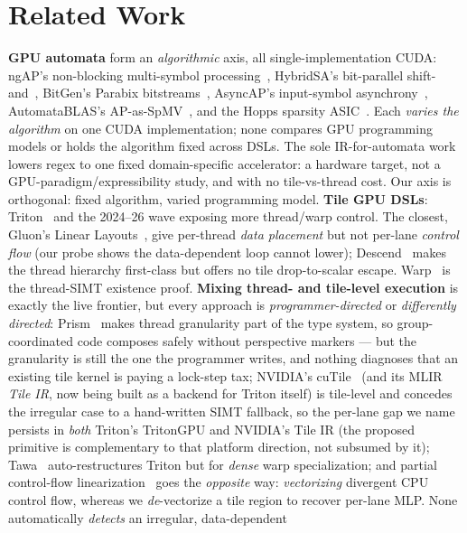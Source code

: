 \documentclass[sigplan,review,anonymous,10pt]{acmart}
\begin{document}
\section{Related Work}
\textbf{GPU automata} form an \emph{algorithmic} axis, all single-implementation CUDA: ngAP's
non-blocking multi-symbol processing~\cite{ngap2024}, HybridSA's bit-parallel
shift-and~\cite{hybridsa2024}, BitGen's Parabix bitstreams~\cite{bitgen2025}, AsyncAP's
input-symbol asynchrony~\cite{asyncap2023}, AutomataBLAS's AP-as-SpMV~\cite{automatablas2025}, and
the Hopps sparsity ASIC~\cite{hopps2025}. Each \emph{varies the algorithm} on one CUDA
implementation; none compares GPU programming models or holds the algorithm fixed across DSLs. The
sole IR-for-automata work~\cite{mlirregex2025} lowers regex to one fixed domain-specific accelerator:
a hardware target, not a GPU-paradigm/expressibility study, and with no tile-vs-thread cost. Our
axis is orthogonal: fixed algorithm, varied programming model.
\textbf{Tile GPU DSLs}: Triton~\cite{triton2019} and the 2024--26 wave exposing more thread/warp
control. The closest, Gluon's Linear Layouts~\cite{linearlayouts2025}, give per-thread \emph{data
placement} but not per-lane \emph{control flow} (our probe shows the data-dependent loop cannot
lower); Descend~\cite{descend2024} makes the thread hierarchy first-class but offers no tile
drop-to-scalar escape. Warp~\cite{warp2022} is the thread-SIMT existence proof.
\textbf{Mixing thread- and tile-level execution} is exactly the live frontier, but every approach is
\emph{programmer-directed} or \emph{differently directed}: Prism~\cite{prism2026} makes thread
granularity part of the type system, so group-coordinated code composes safely without perspective
markers --- but the granularity is still the one the programmer writes, and nothing diagnoses that an
existing tile kernel is paying a lock-step tax; NVIDIA's cuTile~\cite{cutile2025} (and its MLIR \emph{Tile IR}, now
being built as a backend for Triton itself) is tile-level and concedes the irregular case to a
hand-written SIMT fallback, so the per-lane gap we name persists in \emph{both} Triton's TritonGPU and
NVIDIA's Tile IR (the proposed primitive is complementary to that platform direction, not subsumed by it); Tawa~\cite{tawa2026} auto-restructures Triton but for
\emph{dense} warp specialization; and partial control-flow linearization~\cite{partialcfg2018} goes the
\emph{opposite} way: \emph{vectorizing} divergent CPU control flow, whereas we \emph{de}-vectorize a
tile region to recover per-lane MLP. None automatically \emph{detects} an irregular, data-dependent
\end{document}

